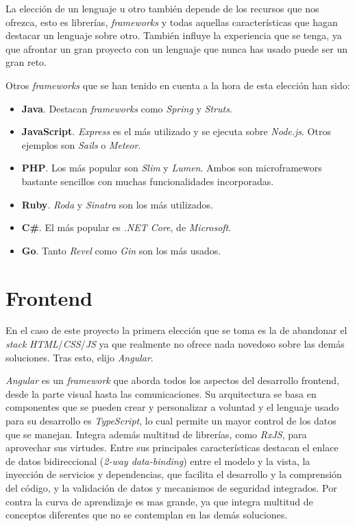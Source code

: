 La elección de un lenguaje u otro también depende de los recursos que nos ofrezca, esto es librerías, \textit{frameworks} y todas aquellas características que hagan destacar un lenguaje sobre otro. También influye la experiencia que se tenga, ya que afrontar un gran proyecto con un lenguaje que nunca has usado puede ser un gran reto.


\bigskip
Otros \textit{frameworks} que se han tenido en cuenta a la hora de esta elección han sido:

\begin{itemize}
	\item \textbf{Java}. Destacan \textit{frameworks} como \textit{Spring} y \textit{Struts}.	
	\item \textbf{JavaScript}. \textit{Express} es el más utilizado y se ejecuta sobre \textit{Node.js}. Otros ejemplos son \textit{Sails} o \textit{Meteor}.	
	\item \textbf{PHP}. Los más popular son \textit{Slim} y \textit{Lumen}. Ambos son microframewors bastante sencillos con muchas funcionalidades incorporadas.	
	\item \textbf{Ruby}. \textit{Roda} y \textit{Sinatra} son los más utilizados.	
	\item \textbf{C\#}. El más popular es \textit{.NET Core}, de \textit{Microsoft}.
	\item \textbf{Go}. Tanto \textit{Revel} como \textit{Gin} son los más usados.
\end{itemize}






\section{Frontend}

En el caso de este proyecto la primera elección que se toma es la de abandonar el \textit{stack} \textit{HTML}/\textit{CSS}/\textit{JS} ya que realmente no ofrece nada novedoso sobre las demás soluciones. Tras esto, elijo \textit{Angular}.

\textit{Angular} es un \textit{framework} que aborda todos los aspectos del desarrollo frontend, desde la parte visual hasta las comunicaciones. Su arquitectura se basa en componentes que se pueden crear y personalizar a voluntad y el lenguaje usado para su desarrollo es \textit{TypeScript}, lo cual permite un mayor control de los datos que se manejan. Integra además multitud de librerías, como \textit{RxJS}, para aprovechar sus virtudes. Entre sus principales características destacan el enlace de datos bidireccional (\textit{2-way data-binding}) entre el modelo y la vista, la inyección de servicios y dependencias, que facilita el desarrollo y la comprensión del código, y la validación de datos y mecanismos de seguridad integrados. Por contra la curva de aprendizaje es mas grande, ya que integra multitud de conceptos diferentes que no se contemplan en las demás soluciones.

